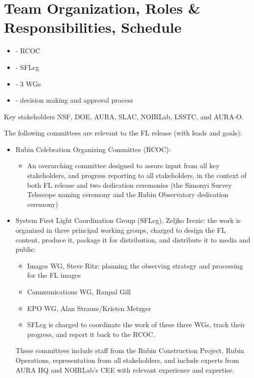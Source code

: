\section{Team Organization, Roles \& Responsibilities, Schedule} \label{sec:team}

\begin{itemize}
\item - RCOC
\item - SFLcg
\item - 3 WGs
\item - decision making and approval process
\end{itemize}

Key stakeholders NSF, DOE, AURA, SLAC, NOIRLab, LSSTC, and AURA-O.

The following committees are relevant to the FL release (with leads and goals):

\begin{itemize}
\item Rubin Celebration Organizing Committee (RCOC):
\begin{itemize}
\item
An overarching committee designed to assure input from all key stakeholders, and progress reporting to all stakeholders, in the context of both FL release and two dedication ceremonies (the Simonyi Survey Telescope naming ceremony and the Rubin Observatory dedication ceremony)
\end{itemize}
\item System First Light Coordination Group (SFLcg), Zeljko Ivezic: the work is organized in three principal working groups, charged to design the FL content, produce it, package it for distribution, and distribute it to media and public:
\begin{itemize}
\item Images WG, Steve Ritz: planning the observing strategy and processing for the FL images
\item Communications WG, Ranpal Gill
\item EPO WG, Alan Strauss/Kristen Metzger
\item SFLcg is charged to coordinate the work of these three WGs, track their progress, and report it back to the RCOC.
\end{itemize}

These committees include staff from the Rubin Construction Project, Rubin Operations, representation from all stakeholders, and include experts from AURA HQ and NOIRLab’s CEE with relevant experience and expertise.

\end{itemize}
